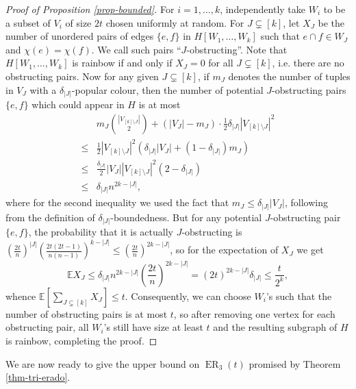 \documentclass[10pt,a4paper]{article}
\theoremstyle{plain}
\theoremstyle{definition}
\newcommand{\erado}[2]{\operatorname{ER}_{#1}(#2)}
\newcommand{\expect}{\mathbb{E}}
\begin{document}
\begin{proof}[Proof of Proposition \ref{prop-bounded}]
    For $i=1,\dots,k$, independently take $W_i$ to be a subset of $V_i$ of size $2t$ chosen uniformly at random. For $J\subsetneq[k]$, let $X_J$ be the number of unordered pairs of edges $\{e,f\}$ in $H[W_1,\dots,W_k]$ such that $e\cap f\in W_J$ and $\chi(e)=\chi(f)$. We call such pairs ``$J$-obstructing''. Note that $H[W_1,\dots,W_k]$ is rainbow if and only if $X_J=0$ for all $J\subsetneq[k]$, i.e. there are no obstructing pairs. Now for any given $J\subsetneq[k]$, if $m_J$ denotes the number of tuples in $V_J$ with a $\delta_{|J|}$-popular colour, then the number of potential $J$-obstructing pairs $\{e,f\}$ which could appear in $H$ is at most
    \begin{align*}
        &m_J\binom{|V_{[k]\setminus J}|}{2}+(|V_J|-m_J)\cdot\frac{1}{2}\delta_{|J|}|V_{[k]\setminus J}|^2 \\
        \le{} &\frac{1}{2}|V_{[k]\setminus J}|^2\left(\delta_{|J|}|V_J|+(1-\delta_{|J|})m_J\right) \\
        \le{} &\frac{\delta_{|J|}}{2}|V_J||V_{[k]\setminus J}|^2(2-\delta_{|J|}) \\
        \le{} &\delta_{|J|}n^{2k-|J|},
    \end{align*}
    where for the second inequality we used the fact that $m_J\le \delta_{|J|}|V_J|$, following from the definition of $\delta_{|J|}$-boundedness. But for any potential $J$-obstructing pair $\{e,f\}$, the probability that it is actually $J$-obstructing is $\left(\frac{2t}{n}\right)^{|J|}\left(\frac{2t(2t-1)}{n(n-1)}\right)^{k-|J|}\le \left(\frac{2t}{n}\right)^{2k-|J|}$, so for the expectation of $X_J$ we get
    $$\expect X_J\le \delta_{|J|}n^{2k-|J|}\left(\frac{2t}{n}\right)^{2k-|J|}=(2t)^{2k-|J|}\delta_{|J|}\le \frac{t}{2^k},$$
    whence $\expect\left[\sum_{J\subsetneq[k]}X_J\right]\le t$. Consequently, we can choose $W_i$'s such that the number of obstructing pairs is at most $t$, so after removing one vertex for each obstructing pair, all $W_i$'s still have size at least $t$ and the resulting subgraph of $H$ is rainbow, completing the proof. 
\end{proof}

We are now ready to give the upper bound on $\erado{3}{t}$ promised by Theorem \ref{thm-tri-erado}.
\end{document}
